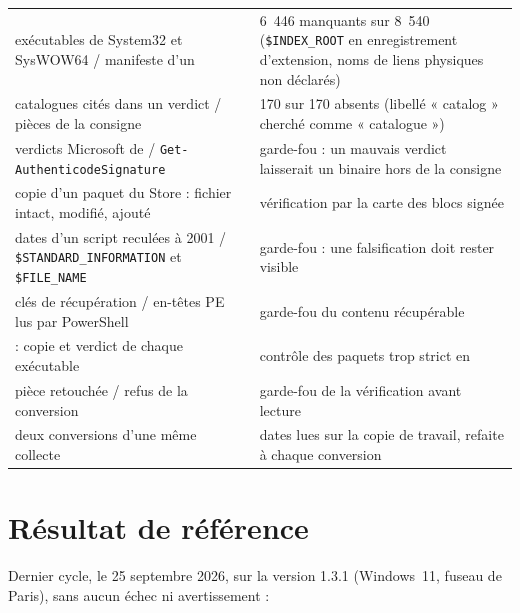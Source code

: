 \documentclass[11pt,a4paper,oneside]{report}
\begin{document}
\begin{longtable}{@{}L{6.6cm}L{8.4cm}@{}}
exécutables de System32 et SysWOW64 / manifeste d'un  
  & 6~446 manquants sur 8~540 (\texttt{\$INDEX\_ROOT} en enregistrement
  d'extension, noms de liens physiques non déclarés) \\
catalogues cités dans un verdict / pièces de la consigne & 170 sur 170 absents
  (libellé « catalog » cherché comme « catalogue ») \\
verdicts Microsoft de \wac{} / \texttt{Get-AuthenticodeSignature} & garde-fou :
  un mauvais verdict laisserait un binaire hors de la consigne \\
copie d'un paquet du Store : fichier intact, modifié, ajouté & vérification par
  la carte des blocs signée \\
dates d'un script reculées à 2001 / \texttt{\$STANDARD\_INFORMATION} et
  \texttt{\$FILE\_NAME} & garde-fou : une falsification doit rester visible \\
clés de récupération / en-têtes PE lus par PowerShell & garde-fou du contenu
  récupérable \\
 : copie et verdict de chaque exécutable & contrôle des
  paquets trop strict en  \\
pièce retouchée / refus de la conversion & garde-fou de la vérification avant
  lecture \\
deux conversions d'une même collecte & dates lues sur la copie de travail,
  refaite à chaque conversion \\
\bottomrule
\end{longtable}

\section{Résultat de référence}

Dernier cycle, le 25 septembre 2026, sur la version 1.3.1 (Windows~11, fuseau
de Paris), sans aucun échec ni avertissement :
\end{document}
